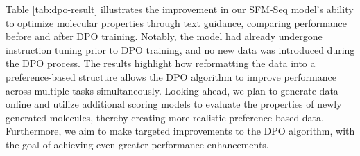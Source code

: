 Table \ref{tab:dpo-result} illustrates the improvement in our SFM-Seq model's ability to optimize molecular properties through text guidance, comparing performance before and after DPO training. Notably, the model had already undergone instruction tuning prior to DPO training, and no new data was introduced during the DPO process. The results highlight how reformatting the data into a preference-based structure allows the DPO algorithm to improve performance across multiple tasks simultaneously.
Looking ahead, we plan to generate data online and utilize additional scoring models to evaluate the properties of newly generated molecules, thereby creating more realistic preference-based data. Furthermore, we aim to make targeted improvements to the DPO algorithm, with the goal of achieving even greater performance enhancements.